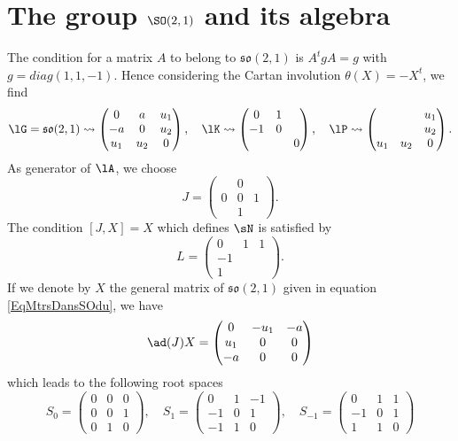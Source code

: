 
\section{The group \texorpdfstring{$\SO(2,1)$}{SO21} and its algebra}   \label{subsec_IwSOdu}

The condition for a matrix $A$ to belong to $\mathfrak{so}(2,1)$ is $A^tgA=g$ with $g=diag(1,1,-1)$. Hence considering the Cartan involution\label{pg:Cartan_SO} $\theta(X)=-X^t$, we find
\begin{equation}  \label{EqMtrsDansSOdu}
\lG=\mathfrak{so}(2,1)\leadsto\begin{pmatrix}
0&a&u_1\\-a&0&u_2\\u_1&u_2&0
\end{pmatrix},\quad
\lK\leadsto\begin{pmatrix}
0&1\\-1&0\\&&0
\end{pmatrix},
\quad
\lP\leadsto\begin{pmatrix}
&&u_1\\
&&u_2\\
u_1&u_2&0
\end{pmatrix}.
\end{equation}
As generator of $\lA$, we choose
\[ 
  J=\begin{pmatrix}
&0\\
0&0&1\\
&1
\end{pmatrix}.
\]
The condition $[J,X]=X$ which defines $\sN$ is satisfied by
\[ 
  L=\begin{pmatrix}
0&1&1\\-1\\1
\end{pmatrix}.
\]
If we denote by $X$ the general matrix of $\mathfrak{so}(2,1)$ given in equation \eqref{EqMtrsDansSOdu}, we have
\[ 
  \ad(J)X=
\begin{pmatrix}
0&-u_{1}&-a\\
u_{1}&0&0\\
-a&0&0
\end{pmatrix}
\]
which leads to the following root spaces
\begin{equation}
S_{0}=
\begin{pmatrix}
0&0&0\\
0&0&1\\
0&1&0
\end{pmatrix},\quad
S_{1}=
\begin{pmatrix}
0&1&-1\\
-1&0&1\\
-1&1&0
\end{pmatrix},\quad
S_{-1}=
\begin{pmatrix}
0&1&1\\
-1&0&1\\
1&1&0
\end{pmatrix}
\end{equation}
